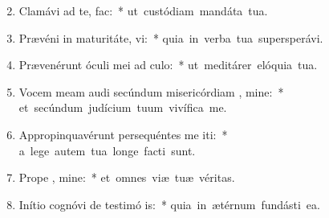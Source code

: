 \begin{flushleft}
\begin{enumerate}[leftmargin=*]
\setcounter{enumi}{1}

\item Clamávi ad te,   fac:~* \mbox{ut custódiam mandáta tua.}
\item Prævéni in maturitáte,  vi:~* \mbox{quia in verba tua supersperávi.}
\item Prævenérunt óculi mei ad  culo:~* \mbox{ut meditárer elóquia tua.}
\item Vocem meam audi secúndum misericórdiam , mine:~* \mbox{et secúndum judícium tuum vivífica me.}
\item Appropinquavérunt persequéntes me iti:~* \mbox{a lege autem tua longe facti sunt.}
\item Prope  , mine:~* \mbox{et omnes viæ tuæ véritas.}
\item Inítio cognóvi de testimó is:~* \mbox{quia in ætérnum fundásti ea.}


\end{enumerate}
\end{flushleft}

